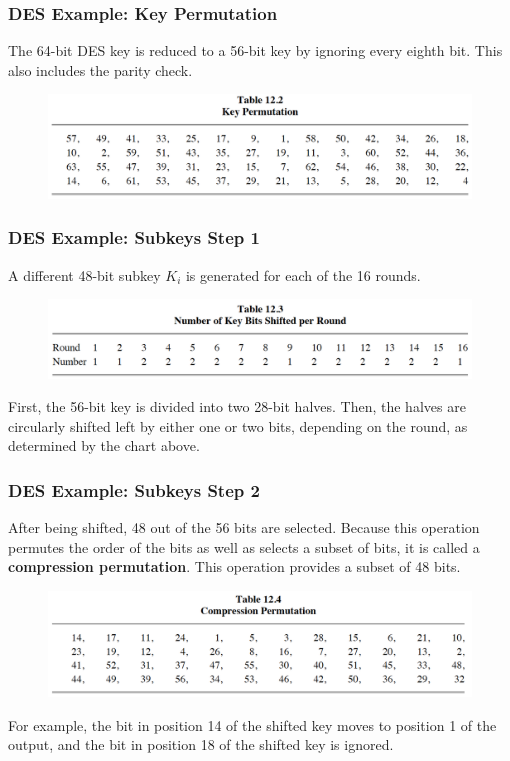 \documentclass{beamer}
\newcommand{\<}{\langle}
\renewcommand{\>}{\rangle}
\begin{document}
\begin{frame}
\frametitle{DES Example: Key Permutation}

The 64-bit DES key is reduced to a 56-bit key by ignoring every eighth bit. This also includes the parity check.

\begin{figure}
\includegraphics[scale=.5]{IMG/ex2}
\end{figure}
\end{frame}


\begin{frame}
\frametitle{DES Example: Subkeys Step 1}

A different 48-bit subkey $K_i$ is generated for each of the 16 rounds.

\begin{figure}
\includegraphics[scale=.5]{IMG/ex3}
\end{figure}

First, the 56-bit key is divided into two 28-bit halves. Then, the halves are circularly shifted left by
either one or two bits, depending on the round, as determined by the chart above. 
\end{frame}



\begin{frame}
\frametitle{DES Example: Subkeys Step 2}

After being shifted, 48 out of the 56 bits are selected. Because this operation permutes the order of the bits as well as selects a subset of bits, it is called a \textbf{compression permutation}. This operation provides a subset of 48 bits. 

\begin{figure}
\includegraphics[scale=.5]{IMG/ex4}
\end{figure}

For example, the bit in position 14 of the shifted key moves to position 1 of the output, and the bit in position 18 of the shifted key is ignored.
\end{frame}
\end{document}
